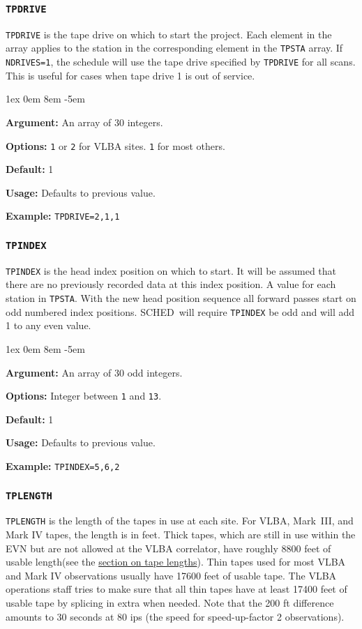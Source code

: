 \documentclass{report}
\newcommand{\schedb}{{\sc SCHED~}}
\newcommand{\rcwbox}[5]{
  \begin{list}{}{\parsep 1ex  \itemsep 0em
                 \leftmargin 8em  \itemindent -5em }
    \item {\bf Argument:} #1
    \item {\bf Options:}  #2
    \item {\bf Default:}  #3
    \item {\bf Usage:}    #4
    \item {\bf Example:}  #5
  \end{list}
}
\begin{document}
\subsubsection{\label{TP:TPDRIVE}{\tt TPDRIVE}}

{\tt TPDRIVE} is the tape drive on which to start the project. Each
element in the array applies to the station in the corresponding
element in the {\tt TPSTA} array. If {\tt NDRIVES=1}, the schedule
will use the tape drive specified by {\tt TPDRIVE} for all scans. This
is useful for cases when tape drive 1 is out of service.

\rcwbox
{An array of 30 integers.}
{{\tt 1} or {\tt 2} for VLBA sites. {\tt 1} for most others.}
{1}
{Defaults to previous value.}
{{\tt TPDRIVE=2,1,1}}

\subsubsection{\label{TP:TPINDEX}{\tt TPINDEX}}

{\tt TPINDEX} is the head index position on which to start. It will
be assumed that there are no previously recorded data at this index
position. A value for each station in {\tt TPSTA}. With the new head
position sequence all forward passes start on odd numbered index
positions. \schedb will require {\tt TPINDEX} be odd and will add
1 to any even value.

\rcwbox
{An array of 30 odd integers.}
{Integer between {\tt 1} and {\tt 13}.}
{1}
{Defaults to previous value.}
{{\tt TPINDEX=5,6,2}}

\subsubsection{\label{TP:TPLENGTH}{\tt TPLENGTH}}

{\tt TPLENGTH} is the length of the tapes in use at each site.  For
VLBA, Mark~III, and Mark IV tapes, the length is in feet.  Thick
tapes, which are still in use within the EVN but are not allowed at
the VLBA correlator, have roughly 8800 feet of usable length(see
the 
{\hyperref[SSSEC:TAPELEN]{section on tape lengths}}).  Thin
tapes used for most VLBA and Mark IV observations usually have 17600
feet of usable tape.  The VLBA operations staff tries to make sure
that all thin tapes have at least 17400 feet of usable tape by
splicing in extra when needed.  Note that the 200 ft difference
amounts to 30 seconds at 80 ips (the speed for speed-up-factor 2
observations).
\end{document}
